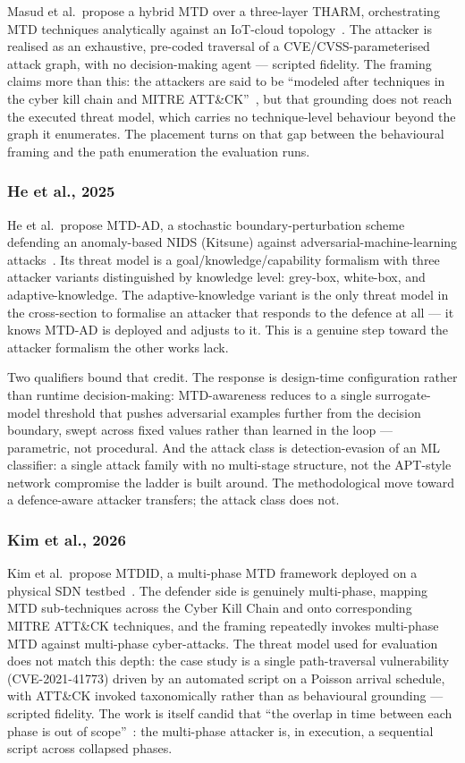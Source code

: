 Masud et al.\ propose a hybrid MTD over a three-layer THARM, orchestrating MTD techniques analytically against an IoT-cloud topology~\cite{masud2025}. The attacker is realised as an exhaustive, pre-coded traversal of a CVE/CVSS-parameterised attack graph, with no decision-making agent --- scripted fidelity. The framing claims more than this: the attackers are said to be ``modeled after techniques in the cyber kill chain and MITRE ATT\&CK''~\cite[p.~7]{masud2025}, but that grounding does not reach the executed threat model, which carries no technique-level behaviour beyond the graph it enumerates. The placement turns on that gap between the behavioural framing and the path enumeration the evaluation runs.

\subsubsection{He et al., 2025}

He et al.\ propose MTD-AD, a stochastic boundary-perturbation scheme defending an anomaly-based NIDS (Kitsune) against adversarial-machine-learning attacks~\cite{he2025}. Its threat model is a goal/knowledge/capability formalism with three attacker variants distinguished by knowledge level: grey-box, white-box, and adaptive-knowledge. The adaptive-knowledge variant is the only threat model in the cross-section to formalise an attacker that responds to the defence at all --- it knows MTD-AD is deployed and adjusts to it. This is a genuine step toward the attacker formalism the other works lack.

Two qualifiers bound that credit. The response is design-time configuration rather than runtime decision-making: MTD-awareness reduces to a single surrogate-model threshold that pushes adversarial examples further from the decision boundary, swept across fixed values rather than learned in the loop --- parametric, not procedural. And the attack class is detection-evasion of an ML classifier: a single attack family with no multi-stage structure, not the APT-style network compromise the ladder is built around. The methodological move toward a defence-aware attacker transfers; the attack class does not.

\subsubsection{Kim et al., 2026}

Kim et al.\ propose MTDID, a multi-phase MTD framework deployed on a physical SDN testbed~\cite{kim2026}. The defender side is genuinely multi-phase, mapping MTD sub-techniques across the Cyber Kill Chain and onto corresponding MITRE ATT\&CK techniques, and the framing repeatedly invokes multi-phase MTD against multi-phase cyber-attacks. The threat model used for evaluation does not match this depth: the case study is a single path-traversal vulnerability (CVE-2021-41773) driven by an automated script on a Poisson arrival schedule, with ATT\&CK invoked taxonomically rather than as behavioural grounding --- scripted fidelity. The work is itself candid that ``the overlap in time between each phase is out of scope''~\cite[p.~7]{kim2026}: the multi-phase attacker is, in execution, a sequential script across collapsed phases.

